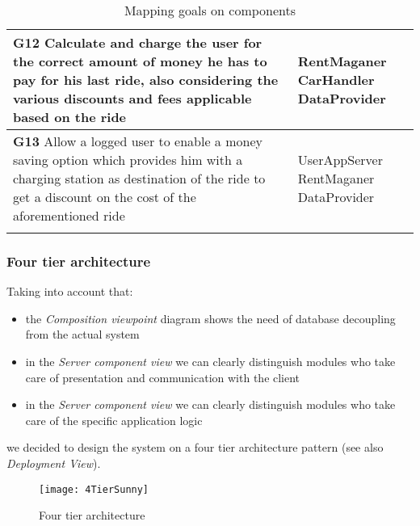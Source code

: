 \begin{longtable}{p{0.7\linewidth}p{0.3\linewidth}}
\midrule
\textbf{G12} Calculate and charge the user for the correct amount of money he has to pay for his last ride, also considering the various discounts and fees applicable based on the ride & \mbox{RentMaganer} \mbox{CarHandler} \mbox{DataProvider}\\
\midrule
\textbf{G13} Allow a logged user to enable a money saving option which provides him with a charging station as destination of the ride to get a discount on the cost of the aforementioned ride & \mbox{UserAppServer} \mbox{RentMaganer} \mbox{DataProvider}\\
\midrule
\bottomrule
\caption{Mapping goals on components}
\end{longtable}

\subsubsection{Four tier architecture}
Taking into account that:
\begin{itemize}
	\item the \emph{Composition viewpoint} diagram shows the need of database decoupling from the actual system
	\item in the \emph{Server component view} we can clearly distinguish modules who take care of presentation and communication with the client
	\item in the \emph{Server component view} we can clearly distinguish modules who take care of the specific application logic
\end{itemize}
we decided to design the system on a four tier architecture pattern (see also \emph{Deployment View}). 
	
\begin{figure}[h]
	\centering
	\texttt{[image: 4TierSunny]}
	\caption{
		\label{fig:fourTier} 
		Four tier architecture
	}
\end{figure}
		
\clearpage

